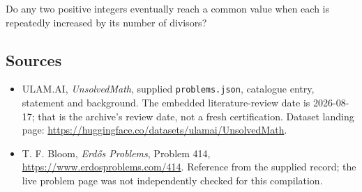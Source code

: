 \documentclass[11pt,a4paper]{article}
\begin{document}
Do any two positive integers eventually reach a common value when each is repeatedly increased by its number of divisors?

\subsection{Sources}

{\small

\begin{itemize}

\item[\hypertarget{source:statement:1}{S1}] ULAM.AI, \emph{UnsolvedMath}, supplied \texttt{problems.json}, catalogue entry, statement and background. The embedded literature-review date is 2026-08-17; that is the archive’s review date, not a fresh certification. Dataset landing page: \url{https://huggingface.co/datasets/ulamai/UnsolvedMath}.

\item[\hypertarget{source:statement:2}{S2}] T. F. Bloom, \emph{Erdős Problems}, Problem 414, \url{https://www.erdosproblems.com/414}. Reference from the supplied record; the live problem page was not independently checked for this compilation.

\end{itemize}

}

\label{end:statement}
\end{document}
